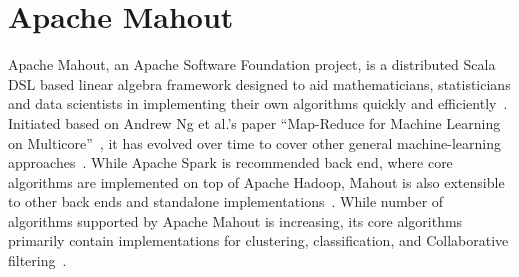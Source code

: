 \section{Apache Mahout}

Apache Mahout, an Apache Software Foundation project, is a distributed Scala DSL based linear algebra framework designed to aid mathematicians, statisticians and data scientists in implementing their own algorithms quickly and efficiently~\cite{hid-sp18-510-web-Mahout}. Initiated based on Andrew Ng et al.'s paper ``Map-Reduce for Machine Learning on Multicore''~\cite{hid-sp18-510-ng-Mahout}, it has evolved over time to cover other general machine-learning approaches~\cite{hid-sp18-510-ibm-Mahout}. While Apache Spark is recommended back end, where core algorithms are implemented on top of Apache Hadoop, Mahout is also extensible to other back ends and standalone implementations~\cite{hid-sp18-510-wiki-Mahout}. While number of algorithms supported by Apache Mahout is increasing, its core algorithms primarily contain implementations for clustering, classification, and Collaborative filtering~\cite{hid-sp18-510-wiki-Mahout}.
